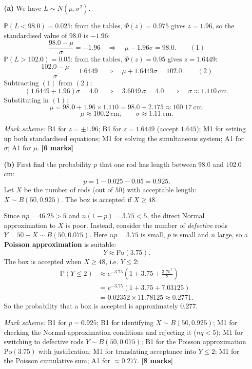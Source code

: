 \documentclass[11pt]{article}
\begin{document}
\begin{corrige}
\textbf{(a)} We have $L \sim N(\mu, \sigma^2)$.

$\mathbb{P}(L < 98.0) = 0.025$: from the tables, $\Phi(z) = 0.975$ gives $z = 1.96$, so the standardised value of $98.0$ is $-1.96$:
\[
\frac{98.0 - \mu}{\sigma} = -1.96 \quad\Longrightarrow\quad \mu - 1.96\sigma = 98.0. \qquad (1)
\]
$\mathbb{P}(L > 102.0) = 0.05$: from the tables, $\Phi(z) = 0.95$ gives $z = 1.6449$:
\[
\frac{102.0 - \mu}{\sigma} = 1.6449 \quad\Longrightarrow\quad \mu + 1.6449\sigma = 102.0. \qquad (2)
\]
Subtracting $(1)$ from $(2)$:
\[
(1.6449 + 1.96)\sigma = 4.0 \quad\Longrightarrow\quad 3.6049\,\sigma = 4.0 \quad\Longrightarrow\quad \sigma \approx 1.110\ \mathrm{cm}.
\]
Substituting in $(1)$:
\[
\mu = 98.0 + 1.96 \times 1.110 = 98.0 + 2.175 \approx 100.17\ \mathrm{cm}.
\]
\[
\boxed{\mu \approx 100.2\ \mathrm{cm}, \qquad \sigma \approx 1.11\ \mathrm{cm}.}
\]

\emph{Mark scheme:} B1 for $z = \pm 1.96$; B1 for $z = 1.6449$ (accept $1.645$); M1 for setting up both standardised equations; M1 for solving the simultaneous system; A1 for $\sigma$; A1 for $\mu$. \textbf{[6 marks]}

\textbf{(b)} First find the probability $p$ that one rod has length between $98.0$ and $102.0$ cm:
\[
p = 1 - 0.025 - 0.05 = 0.925.
\]
Let $X$ be the number of rods (out of $50$) with acceptable length: $X \sim B(50, 0.925)$. The box is accepted if $X \ge 48$.

Since $np = 46.25 > 5$ and $n(1-p) = 3.75 < 5$, the direct Normal approximation to $X$ is poor. Instead, consider the number of \emph{defective} rods $Y = 50 - X \sim B(50, 0.075)$. Here $np = 3.75$ is small, $p$ is small and $n$ large, so a \textbf{Poisson approximation} is suitable:
\[
Y \approx \mathrm{Po}(3.75).
\]
The box is accepted when $X \ge 48$, i.e. $Y \le 2$:
\begin{align*}
\mathbb{P}(Y \le 2) &\approx e^{-3.75}\left(1 + 3.75 + \frac{3.75^2}{2}\right)\\
&= e^{-3.75}\left(1 + 3.75 + 7.03125\right)\\
&= 0.02352 \times 11.78125 \approx 0.2771.
\end{align*}
So the probability that a box is accepted is approximately $0.277$.

\emph{Mark scheme:} B1 for $p = 0.925$; B1 for identifying $X \sim B(50, 0.925)$; M1 for checking the Normal-approximation conditions and rejecting it ($nq < 5$); M1 for switching to defective rods $Y \sim B(50, 0.075)$; B1 for the Poisson approximation $\mathrm{Po}(3.75)$ with justification; M1 for translating acceptance into $Y \le 2$; M1 for the Poisson cumulative sum; A1 for $\approx 0.277$. \textbf{[8 marks]}


\end{corrige}
\end{document}

